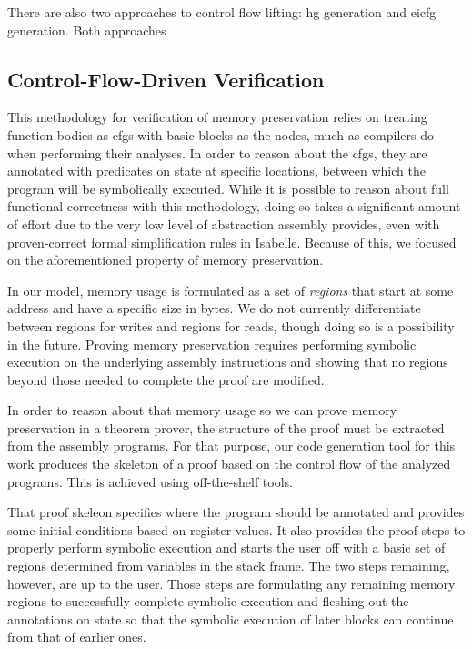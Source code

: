 There are also two approaches to control flow lifting: \ac{hg} generation and \ac{eicfg} generation.
Both approaches 

\subsection{Control-Flow-Driven Verification}
This methodology for verification of memory preservation relies on treating function bodies
as \acp{cfg} with basic blocks as the nodes,
much as compilers do when performing their analyses.
In order to reason about the \acp{cfg},
they are annotated with predicates on state at specific locations,
between which the program will be symbolically executed.
While it is possible to reason about full functional correctness with this methodology,
doing so takes a significant amount of effort due to the very low level of abstraction
assembly provides, even with proven-correct formal simplification rules in Isabelle.
Because of this, we focused on the aforementioned property of memory preservation.

In our model, memory usage is formulated as a set of \emph{regions}
that start at some address and have a specific size in bytes.
We do not currently differentiate between regions for writes and regions for reads,
though doing so is a possibility in the future.
Proving memory preservation requires performing symbolic execution
on the underlying assembly instructions
and showing that no regions beyond those needed to complete the proof are modified.

In order to reason about that memory usage
so we can prove memory preservation in a theorem prover,
the structure of the proof must be extracted from the assembly programs.
For that purpose,
our code generation tool for this work produces the skeleton of a proof
based on the control flow of the analyzed programs.
This is achieved using off-the-shelf tools.

That proof skeleon specifies where the program should be annotated
and provides some initial conditions based on register values.
It also provides the proof steps to properly perform symbolic execution
and starts the user off with a basic set of regions
determined from variables in the stack frame.
The two steps remaining, however, are up to the user.
Those steps are formulating any remaining memory regions
to successfully complete symbolic execution
and fleshing out the annotations on state so that the symbolic execution of later blocks
can continue from that of earlier ones.

